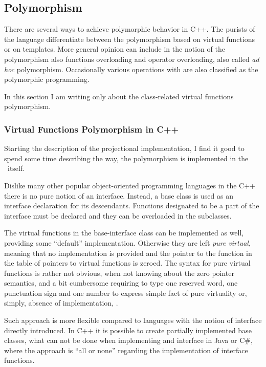 \subsection{Polymorphism}

There are several ways to achieve polymorphic behavior in C++. The purists of the language differentiate 
between the polymorphism based on virtual functions or on templates. More general opinion can include
in the notion of the polymorphism also functions overloading and operator overloading, also called 
\emph{ad hoc} polymorphism. Occasionally various operations with  are also classified as 
the polymorphic programming.

In this section I am writing only about the class-related virtual functions polymorphism.

\subsubsection{Virtual Functions Polymorphism in C++}
\label{cpppolydefs}

Starting the description of the projectional implementation, I find it good to spend some time describing
the way, the polymorphism is implemented in the \cpppl\ itself.

Dislike many other popular object-oriented programming languages in the C++ there is no pure notion of
an interface. Instead, a base class is used as an interface declaration for its descendants. Functions
designated to be a part of the interface must be declared  and they can be overloaded in
the subclasses.

The virtual functions in the base-interface class can be implemented as well, providing some ``default''
implementation. Otherwise they are left \emph{pure virtual}, meaning that no implementation is provided
and the pointer to the function in the table of pointers to virtual functions is zeroed. The syntax
for pure virtual functions is rather not obvious, when not knowing about the zero pointer semantics,
and a bit cumbersome requiring to type one reserved word, one punctuation sign and one number to 
express simple fact of pure virtuality or, simply, absence of implementation, .


Such approach is more flexible compared to languages with the notion of interface directly introduced.
In C++ it is possible to create partially implemented base classes, what can not be done when implementing
and interface in Java or C\#, where the approach is ``all or none'' regarding the implementation of interface
functions.


